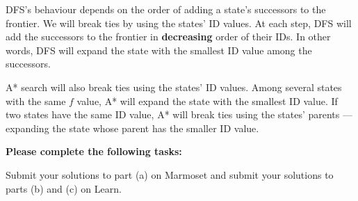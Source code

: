 \documentclass[12pt]{article}
\begin{document}
DFS's behaviour depends on the order of adding a state's successors to the frontier. We will break ties by using the states' ID values. At each step, DFS will add the successors to the frontier in {\bf decreasing} order of their IDs. In other words, DFS will expand the state with the smallest ID value among the successors.

A* search will also break ties using the states' ID values. Among several states with the same $f$ value, A* will expand the state with the smallest ID value. If two states have the same ID value, A* will break ties using the states' parents --- expanding the state whose parent has the smaller ID value.

{\bf Please complete the following tasks:}

Submit your solutions to part (a) on Marmoset and submit your solutions to parts (b) and (c) on Learn.
\end{document}

